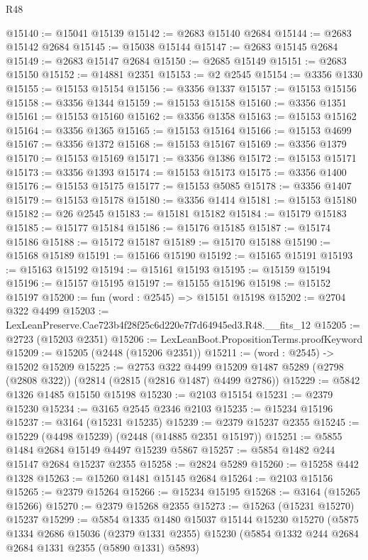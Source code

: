 \begin{lexlean}{R48}
\begin{coremodule}
@15140 := @15041 @15139
@15142 := @2683 @15140 @2684
@15144 := @2683 @15142 @2684
@15145 := @15038 @15144
@15147 := @2683 @15145 @2684
@15149 := @2683 @15147 @2684
@15150 := @2685 @15149
@15151 := @2683 @15150
@15152 := @14881 @2351
@15153 := @2 @2545
@15154 := @3356 @1330
@15155 := @15153 @15154
@15156 := @3356 @1337
@15157 := @15153 @15156
@15158 := @3356 @1344
@15159 := @15153 @15158
@15160 := @3356 @1351
@15161 := @15153 @15160
@15162 := @3356 @1358
@15163 := @15153 @15162
@15164 := @3356 @1365
@15165 := @15153 @15164
@15166 := @15153 @4699
@15167 := @3356 @1372
@15168 := @15153 @15167
@15169 := @3356 @1379
@15170 := @15153 @15169
@15171 := @3356 @1386
@15172 := @15153 @15171
@15173 := @3356 @1393
@15174 := @15153 @15173
@15175 := @3356 @1400
@15176 := @15153 @15175
@15177 := @15153 @5085
@15178 := @3356 @1407
@15179 := @15153 @15178
@15180 := @3356 @1414
@15181 := @15153 @15180
@15182 := @26 @2545
@15183 := @15181 @15182
@15184 := @15179 @15183
@15185 := @15177 @15184
@15186 := @15176 @15185
@15187 := @15174 @15186
@15188 := @15172 @15187
@15189 := @15170 @15188
@15190 := @15168 @15189
@15191 := @15166 @15190
@15192 := @15165 @15191
@15193 := @15163 @15192
@15194 := @15161 @15193
@15195 := @15159 @15194
@15196 := @15157 @15195
@15197 := @15155 @15196
@15198 := @15152 @15197
@15200 := fun (word : @2545) => @15151 @15198
@15202 := @2704 @322 @4499
@15203 := LexLeanPreserve.Cae723b4f28f25c6d220e7f7d64945ed3.R48.__fits_12
@15205 := @2723 (@15203 @2351)
@15206 := LexLeanBoot.PropositionTerms.proofKeyword
@15209 := @15205 (@2448 (@15206 @2351))
@15211 := (word : @2545) -> @15202 @15209
@15225 := @2753
    @322
    @4499
    @15209
    @1487
    @5289
    (@2798 (@2808 @322))
    (@2814 (@2815 (@2816 @1487) @4499 @2786))
@15229 := @5842 @1326 @1485 @15150 @15198
@15230 := @2103 @15154
@15231 := @2379 @15230
@15234 := @3165 @2545 @2346 @2103
@15235 := @15234 @15196
@15237 := @3164 (@15231 @15235)
@15239 := @2379 @15237 @2355
@15245 := @15229 (@4498 @15239) (@2448 (@14885 @2351 @15197))
@15251 := @5855 @1484 @2684 @15149 @4497 @15239 @5867
@15257 := @5854 @1482 @244 @15147 @2684 @15237 @2355
@15258 := @2824 @5289
@15260 := @15258 @442 @1328
@15263 := @15260 @1481 @15145 @2684
@15264 := @2103 @15156
@15265 := @2379 @15264
@15266 := @15234 @15195
@15268 := @3164 (@15265 @15266)
@15270 := @2379 @15268 @2355
@15273 := @15263 (@15231 @15270) @15237
@15299 := @5854
    @1335
    @1480
    @15037
    @15144
    @15230
    @15270
    (@5875
      @1334
      @2686
      @15036
      (@2379 @1331 @2355)
      @15230
      (@5854 @1332 @244 @2684 @2684 @1331 @2355 (@5890 @1331) @5893)

\end{coremodule}
\end{lexlean}
